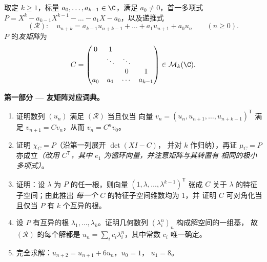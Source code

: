 \begin{problem}
\label{pb:b2:reduction:1}
取定 $k \geq 1$，标量 $a_0, \dots, a_{k-1} \in \C$，满足 $a_0
\neq 0$，首一多项式 $P = X^k - a_{k-1}X^{k-1} - \dots -
a_1 X - a_0$，以及递推式
\[
(\mathcal R)\colon\quad u_{n+k} = a_{k-1}u_{n+k-1} + \dots +
a_1 u_{n+1} + a_0 u_n \qquad (n \geq 0).
\]
$P$ 的\emph{友矩阵}为
\[
C =
\begin{pmatrix}
0 & 1 & & \\
 & \ddots & \ddots & \\
 & & 0 & 1\\
a_0 & a_1 & \cdots & a_{k-1}
\end{pmatrix}
\in \mathcal{M}_k(\C).
\]

\medskip
\noindent\textbf{第一部分 --- 友矩阵对应词典。}
\begin{enumerate}
  \item 证明数列 $(u_n)$ 满足 $(\mathcal R)$ 当且仅当
        向量 $v_n = (u_n, u_{n+1}, \dots,
        u_{n+k-1})^{\mathsf T}$ 满足 $v_{n+1} = Cv_n$，从而
        $v_n = C^n v_0$。
  \item 证明 $\chi_C = P$（沿第一列展开 $\det(XI - C)$，
        并对 $k$ 作归纳），再证 $\mu_C = P$
        亦成立\emph{（改用 $C^{\mathsf T}$，其中 $e_1$
        为循环向量，并注意矩阵与其转置有
        相同的极小多项式）}。
  \item 证明：设 $\lambda$ 为 $P$ 的任一根，则向量
        $(1, \lambda, \dots, \lambda^{k-1})^{\mathsf T}$ 张成
        $C$ 关于 $\lambda$ 的特征子空间；由此推出
        \emph{每一个} $C$ 的特征子空间维数均为 $1$，并
        证明 $C$ 可对角化当且仅当 $P$ 有 $k$
        个互异的根。
  \item 设 $P$ 有互异的根 $\lambda_1, \dots,
        \lambda_k$。证明几何数列
        $(\lambda_i^n)_n$ 构成解空间的一组基，
        故 $(\mathcal R)$ 的每个解都是 $u_n = \sum_i
        c_i\lambda_i^n$，其中常数 $c_i$ 唯一确定。
  \item 完全求解：$u_{n+2} = u_{n+1} + 6u_n$，$u_0 = 1$，
        $u_1 = 8$。
\end{enumerate}


\end{problem}
